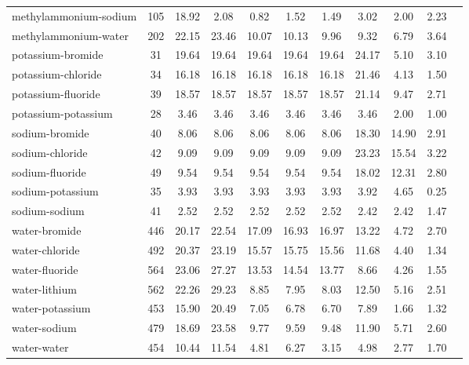 \begin{longtable}{lcccccccccc}
methylammonium-sodium & 105  & 18.92 & 2.08 & 0.82 & 1.52 & 1.49 & 3.02 & 2.00 & 2.23\\
methylammonium-water & 202  & 22.15 & 23.46 & 10.07 & 10.13 & 9.96 & 9.32 & 6.79 & 3.64\\
potassium-bromide & 31  & 19.64 & 19.64 & 19.64 & 19.64 & 19.64 & 24.17 & 5.10 & 3.10\\
potassium-chloride & 34  & 16.18 & 16.18 & 16.18 & 16.18 & 16.18 & 21.46 & 4.13 & 1.50\\
potassium-fluoride & 39  & 18.57 & 18.57 & 18.57 & 18.57 & 18.57 & 21.14 & 9.47 & 2.71\\
potassium-potassium & 28  & 3.46 & 3.46 & 3.46 & 3.46 & 3.46 & 3.46 & 2.00 & 1.00\\
sodium-bromide & 40  & 8.06 & 8.06 & 8.06 & 8.06 & 8.06 & 18.30 & 14.90 & 2.91\\
sodium-chloride & 42  & 9.09 & 9.09 & 9.09 & 9.09 & 9.09 & 23.23 & 15.54 & 3.22\\
sodium-fluoride & 49  & 9.54 & 9.54 & 9.54 & 9.54 & 9.54 & 18.02 & 12.31 & 2.80\\
sodium-potassium & 35  & 3.93 & 3.93 & 3.93 & 3.93 & 3.93 & 3.92 & 4.65 & 0.25\\
sodium-sodium & 41  & 2.52 & 2.52 & 2.52 & 2.52 & 2.52 & 2.42 & 2.42 & 1.47\\
water-bromide & 446  & 20.17 & 22.54 & 17.09 & 16.93 & 16.97 & 13.22 & 4.72 & 2.70\\
water-chloride & 492  & 20.37 & 23.19 & 15.57 & 15.75 & 15.56 & 11.68 & 4.40 & 1.34\\
water-fluoride & 564  & 23.06 & 27.27 & 13.53 & 14.54 & 13.77 & 8.66 & 4.26 & 1.55\\
water-lithium & 562  & 22.26 & 29.23 & 8.85 & 7.95 & 8.03 & 12.50 & 5.16 & 2.51\\
water-potassium & 453  & 15.90 & 20.49 & 7.05 & 6.78 & 6.70 & 7.89 & 1.66 & 1.32\\
water-sodium & 479  & 18.69 & 23.58 & 9.77 & 9.59 & 9.48 & 11.90 & 5.71 & 2.60\\
water-water & 454  & 10.44 & 11.54 & 4.81 & 6.27 & 3.15 & 4.98 & 2.77 & 1.70\\
\hline
\end{longtable}

